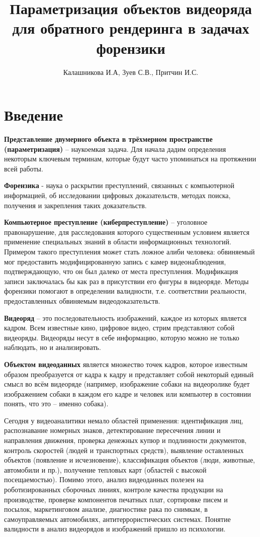 \documentclass[]{article}
\title{Параметризация объектов видеоряда для обратного рендеринга в задачах форензики}
\author{Калашникова И.А, Зуев С.В., Притчин И.С.}
\begin{document}
	
	\maketitle
	
	\begin{abstract}
		
	\end{abstract}
	
	\section*{Введение}
	\textbf{Представление двумерного объекта в трёхмерном пространстве (параметризация)} – наукоемкая задача. Для начала дадим определения некоторым ключевым терминам, которые будут часто упоминаться на протяжении всей работы. 
	
	\textbf{Форензика} - наука о раскрытии преступлений, связанных с компьютерной информацией, об исследовании цифровых доказательств, методах поиска, получения и закрепления таких доказательств. 
	
	\textbf{Компьютерное преступление (киберпреступление)} – уголовное правонарушение, для расследования которого существенным условием является применение специальных знаний в области информационных технологий. Примером такого преступления может стать ложное алиби человека: обвиняемый мог предоставить модифицированную запись с камер видеонаблюдения, подтверждающую, что он был далеко от места преступления. Модификация записи заключалась бы как раз в присутствии его фигуры в видеоряде. Методы форензики помогают в определении валидности, т.е. соответствии реальности, предоставленных обвиняемым видеодоказательств.
	
	\textbf{Видеоряд} – это последовательность изображений, каждое из которых является кадром. Всем известные кино, цифровое видео, стрим представляют собой видеоряды. Видеоряды несут в себе информацию, которую можно не только наблюдать, но и анализировать.
	
	\textbf{Объектом видеоданных} является множество точек кадров, которое известным образом преобразуется от кадра к кадру и представляет собой некоторый единый смысл во всём видеоряде (например, изображение собаки на видеоролике будет изображением собаки в каждом его кадре и человек или компьютер в состоянии понять, что это – именно собака).
	
	Сегодня у видеоаналитики немало областей применения: идентификация лиц, распознавание номерных знаков, детектирование пересечения линии и направления движения, проверка денежных купюр и подлинности документов, контроль скоростей (людей и транспортных средств), выявление оставленных объектов (появление и исчезновение), классификация объектов (люди, животные, автомобили и пр.), получение тепловых карт (областей с высокой посещаемостью). Помимо этого, анализ видеоданных полезен на роботизированных сборочных линиях, контроле качества продукции на производстве, проверке компонентов печатных плат, сортировке писем и посылок, маркетинговом анализе, диагностике рака по снимкам, в самоуправляемых автомобилях, антитеррористических системах.
	Понятие валидности в анализ видеорядов и изображений пришло из психологии.
	
\end{document}
